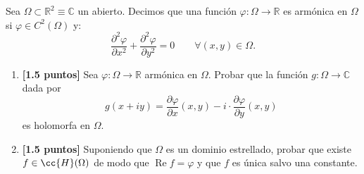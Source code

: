 \documentclass[12pt]{article}
\renewcommand{\Re}{\operatorname{Re}} %
\begin{document}
    \begin{ejercicio}[3 puntos] Sea $\Omega \subset \mathbb{R}^2 \equiv \mathbb{C}$ un abierto. Decimos que una función $\varphi : \Omega \to \mathbb{R}$ es armónica en $\Omega$ si $\varphi \in C^2(\Omega)$ y:
    \begin{equation*}
        \frac{\partial^2 \varphi}{\partial x^2} + \frac{\partial^2 \varphi}{\partial y^2} = 0\qquad \forall (x, y) \in \Omega.
    \end{equation*}

    \begin{enumerate}
        \item \textbf{[1.5 puntos]} Sea $\varphi : \Omega \to \mathbb{R}$ armónica en $\Omega$. Probar que la función $g : \Omega \to \mathbb{C}$ dada por
        $$g(x + iy) = \frac{\partial \varphi}{\partial x}(x, y) - i\cdot  \frac{\partial \varphi}{\partial y}(x, y)$$
        es holomorfa en $\Omega$.

        \item \textbf{[1.5 puntos]} Suponiendo que $\Omega$ es un dominio estrellado, probar que existe $f \in \cc{H}(\Omega)$ de modo que $\Re f = \varphi$ y que $f$ es única salvo una constante.
        
    \end{enumerate}
    \end{ejercicio}



    \newpage
    \setcounter{ejercicio}{0}
\end{document}

